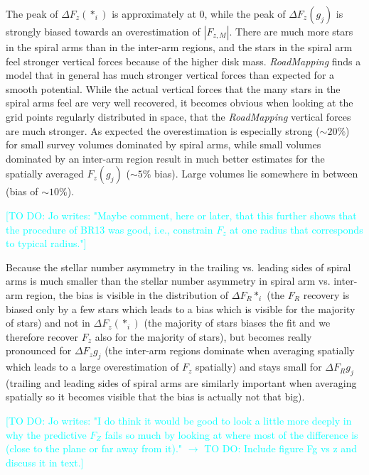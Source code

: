 \documentclass[iop,revtex4,numberedappendix,appendixfloats]{emulateapj}
\newcommand{\RM}{{\sl RoadMapping}}
\newcommand{\Jo}[1]{\textcolor{Cyan}{#1}}
\begin{document}
The peak of $\Delta F_z(*_i)$ is approximately at 0, while the peak of $\Delta F_z(g_j)$ is strongly biased towards an overestimation of $|F_{z,M}|$. There are much more stars in the spiral arms than in the inter-arm regions, and the stars in the spiral arm feel stronger vertical forces because of the higher disk mass. \RM{} finds a model that in general has much stronger vertical forces than expected for a smooth potential. While the actual vertical forces that the many stars in the spiral arms feel are very well recovered, it becomes obvious when looking at the grid points regularly distributed in space, that the \RM{} vertical forces are much stronger. As expected the overestimation is especially strong ($\sim 20 \%$) for small survey volumes dominated by spiral arms, while small volumes dominated by an inter-arm region result in much better estimates for the spatially averaged $F_z(g_j)$ ($\sim5\%$ bias). Large volumes lie somewhere in between (bias of $\sim10\%$).

\Jo{[TO DO: Jo writes: "Maybe comment, here or later, that this further shows that the procedure of BR13 was good, i.e., constrain $F_z$ at one radius that corresponds to typical radius."]}

Because the stellar number asymmetry in the trailing vs. leading sides of spiral arms is much smaller than the stellar number asymmetry in spiral arm vs. inter-arm region, the bias is visible in the distribution of $\Delta F_R{*_i}$ (the $F_R$ recovery is biased only by a few stars which leads to a bias which is visible for the majority of stars) and not in $\Delta F_z(*_i)$ (the majority of stars biases the fit and we therefore recover $F_z$ also for the majority of stars), but becomes really pronounced for $\Delta F_z{g_j}$ (the inter-arm regions dominate when averaging spatially which leads to a large overestimation of $F_z$ spatially) and stays small for $\Delta F_R{g_j}$ (trailing and leading sides of spiral arms are similarly important when averaging spatially so it becomes visible that the bias is actually not that big).

\Jo{[TO DO: Jo writes: "I do think it would be good to look a little more deeply in why the predictive $F_Z$ fails so much by looking at where most of the difference is (close to the plane or far away from it)." $\longrightarrow$ TO DO: Include figure Fg vs z and discuss it in text.]}
\end{document}
